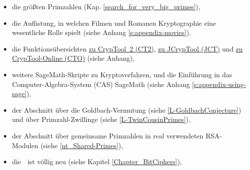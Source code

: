 \begin{itemize}
  \item die größten Primzahlen (Kap. \ref{search_for_very_big_primes}),
  \item die Auflistung, in welchen Filmen und Romanen Kryptographie eine
        wesentliche Rolle spielt (siehe Anhang \ref{s:appendix-movies}),
  \item die Funktionsübersichten
        \hyperlink{appendix-template-overview-CT2}{zu CrypTool~2 (CT2)},
        \hyperlink{appendix-function-overview-JCT}{zu JCrypTool (JCT)} und
        \hyperlink{appendix-function-overview-CTO}{zu CrypTool-Online (CTO)}
        (siehe Anhang),
  \item weitere SageMath-Skripte zu Kryptoverfahren, und die Einführung in das
        Computer-Algebra-System (CAS) SageMath (siehe
        Anhang \ref{s:appendix-using-sage}),
  \item der Abschnitt über die Goldbach-Vermutung
        (siehe \ref{L-GoldbachConjecture}) und über Primzahl-Zwillinge
        (siehe \ref{L-TwinCousinPrimes}),
  \item der Abschnitt über gemeinsame Primzahlen in real verwendeten
        RSA-Modulen (siehe \ref{nt_Shared-Primes}),
  \item die~\glqq {}\grqq~ist völlig neu
	(siehe Kapitel \ref{Chapter_BitCiphers}),


\end{itemize}
